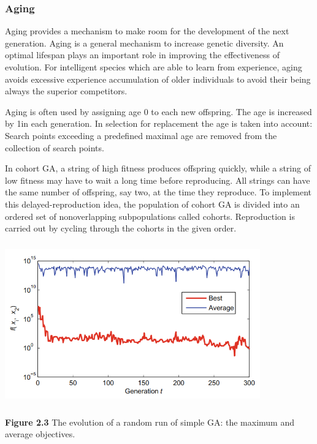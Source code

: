 \documentclass[14pt]{article}
\numberwithin{equation}{subsection}
\begin{document}
			\subsubsection{Aging}Aging provides a mechanism to make room for the development of the next generation.
			Aging is a general mechanism to increase genetic diversity. An optimal lifespan plays an important role in
			improving the effectiveness of evolution. For intelligent species which are able to learn from experience,
			aging avoids excessive experience accumulation of older individuals to avoid their being always the superior
			competitors. \par
			Aging is often used by assigning age 0 to each new offspring. The age is increased by 1in each generation. In
			selection for replacement the age is taken into account: Search points exceeding a predefined maximal age are
			removed from the collection of search points. \par
			In cohort GA, a string of high fitness produces offspring quickly, while a string of low fitness may
			have to wait a long time before reproducing. All strings can have the same number of offspring, say two, at
			the time they reproduce. To implement this delayed-reproduction idea, the population of cohort GA is divided
			into an ordered set of nonoverlapping subpopulations called cohorts. Reproduction is carried out by cycling
			through the cohorts in the given order.
			
			\begin{center}
				\includegraphics[width=11cm, height=7cm]{exploitation-vs-exploration_figure-2-3.PNG}
			\end{center}
			
			\noindent \textbf{Figure 2.3} The evolution of a random run of simple GA: the maximum and average objectives.
			
\end{document}
